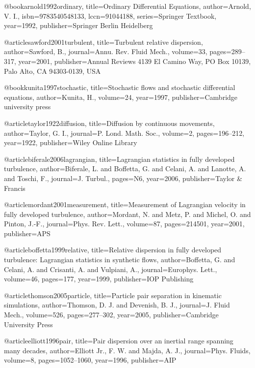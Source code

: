   @book{arnold1992ordinary,
    title={{Ordinary Differential Equations}},
    author={Arnold, V. I.},
    isbn={9783540548133},
    lccn={91044188},
    series={Springer Textbook},
    year={1992},
    publisher={Springer Berlin Heidelberg}
  }

  @article{sawford2001turbulent,
    title={{Turbulent relative dispersion}},
    author={Sawford, B.},
    journal={Annu. Rev. Fluid Mech.},
    volume={33},
    pages={289--317},
    year={2001},
    publisher={Annual Reviews 4139 El Camino Way, PO Box 10139, Palo Alto, CA 94303-0139, USA}
  }

  @book{kunita1997stochastic,
    title={{Stochastic flows and stochastic differential equations}},
    author={Kunita, H.},
    volume={24},
    year={1997},
    publisher={Cambridge university press}
  }

  @article{taylor1922diffusion,
    title={{Diffusion by continuous movements}},
    author={Taylor, G. I.},
    journal={P. Lond. Math. Soc.},
    volume={2},
    pages={196--212},
    year={1922},
    publisher={Wiley Online Library}
  }

  @article{biferale2006lagrangian,
    title={{Lagrangian statistics in fully developed turbulence}},
    author={Biferale, L. and Boffetta, G. and Celani, A. and Lanotte, A. and Toschi, F.},
    journal={J. Turbul.},
    pages={N6},
    year={2006},
    publisher={Taylor \& Francis}
  }

  @article{mordant2001measurement,
    title={{Measurement of Lagrangian velocity in fully developed turbulence}},
    author={Mordant, N. and Metz, P. and Michel, O. and Pinton, J.-F.},
    journal={Phys. Rev. Lett.},
    volume={87},
    pages={214501},
    year={2001},
    publisher={APS}
  }

  @article{boffetta1999relative,
    title={{Relative dispersion in fully developed turbulence: Lagrangian statistics in synthetic flows}},
    author={Boffetta, G. and Celani, A. and Crisanti, A. and Vulpiani, A.},
    journal={Europhys. Lett.},
    volume={46},
    pages={177},
    year={1999},
    publisher={IOP Publishing}
  }

  @article{thomson2005particle,
    title={{Particle pair separation in kinematic simulations}},
    author={Thomson, D. J. and Devenish, B. J.},
    journal={J. Fluid Mech.},
    volume={526},
    pages={277--302},
    year={2005},
    publisher={Cambridge University Press}
  }

  @article{elliott1996pair,
    title={{Pair dispersion over an inertial range spanning many decades}},
    author={Elliott Jr., F. W. and Majda, A. J.},
    journal={Phys. Fluids},
    volume={8},
    pages={1052--1060},
    year={1996},
    publisher={AIP}
  }

